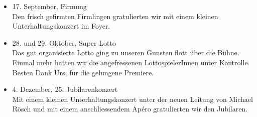 \begin{history}
\begin{itemize}
        \item[]17. September, Firmung\\
        Den frisch gefirmten Firmlingen gratulierten wir mit einem kleinen
        Unterhaltungskonzert im Foyer.

        \item[]28. und 29. Oktober, Super Lotto\\
        Das gut organisierte Lotto ging zu unseren Gunsten flott über die Bühne.
        Einmal mehr hatten wir die angefressenen LottospielerInnen unter
        Kontrolle. Besten Dank Urs, für die gelungene Premiere.

        \item[]4. Dezember, 25. Jubilarenkonzert\\
        Mit einem kleinen Unterhaltungskonzert unter der neuen Leitung von
        Michael Rösch und mit einem anschliessendem Apéro gratulierten wir den
        Jubilaren.



    \end{itemize}

\end{history}
